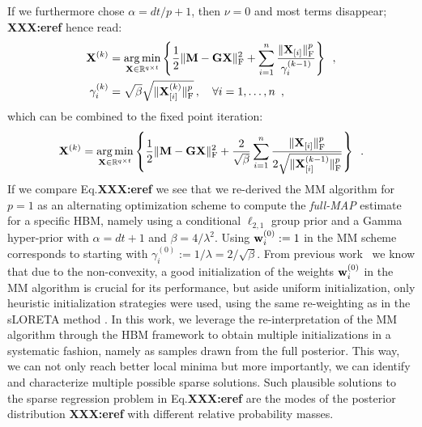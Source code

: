 If we furthermore chose $\alpha = d t/p + 1$, then $\nu = 0$ and most terms disappear; \textbf{XXX:eref}%
 hence read:
\begin{eqnarray}
\mathbf{X}^{(k)} &= \mathop{\mathrm{arg}\,\mathrm{min}}_{\mathbf{X}\in\mathbb{R}^{q \times t}} \left\lbrace \frac{1}{2} \|{\mathbf{M} -\mathbf{G} \mathbf{X}}\|_{\rm F}^2 + \sum_{i=1}^n  \frac{\|{\mathbf{X}_{[i]}}\|_{\rm F}^p}{\gamma^{(k-1)}_i} \right\rbrace \enspace, \label{eq:AO-nu0-X}\\
\gamma^{(k)}_i &= \sqrt{\beta} \sqrt{\|{\mathbf{X}^{(k)}_{[i]}}\|_{\rm F}^p} \, , \quad \forall i=1,\ldots,n \enspace, \label{eq:AO-nu0-gamma}
\end{eqnarray}
which can be combined to the fixed point iteration:
\begin{equation} \label{eq:AO-nu0-2}
\mathbf{X}^{(k)} = \mathop{\mathrm{arg}\,\mathrm{min}}_{\mathbf{X}\in\mathbb{R}^{q \times t}} \left\lbrace \frac{1}{2} \|{\mathbf{M} -\mathbf{G} \mathbf{X}}\|_{\rm F}^2 + \frac{2}{\sqrt{\beta}} \sum_{i=1}^n  \frac{\|{\mathbf{X}_{[i]}}\|_{\rm F}^p}{2 \sqrt{\|{\mathbf{X}^{(k-1)}_{[i]}}\|_{\rm F}^p}} \right\rbrace \enspace .
\end{equation}
If we compare Eq.\textbf{XXX:eref}%
 we see that we re-derived the MM algorithm for $p=1$ as an alternating optimization scheme to compute the \emph{full-MAP} estimate for a specific HBM, namely using a conditional $\ell_{2,1}$ group prior and a Gamma hyper-prior with $\alpha = dt + 1$ and $\beta = 4/\lambda^2$. Using $\mathbf{w}^{(0)}_{i} := 1$ in the MM scheme corresponds to starting with $\gamma_i^{(0)} := 1/\lambda =  2/\sqrt{\beta}$.
From previous work~\cite{strohmeier-etal:16} we know that due to the non-convexity, a good initialization of the weights $\mathbf{w}^{(0)}_{i}$ in the MM algorithm is crucial for its performance, but aside uniform initialization, only heuristic initialization strategies were used, \eg using the same re-weighting as in the sLORETA method \cite{Pa02}. In this work, we leverage the re-interpretation of the MM algorithm through the HBM framework to obtain multiple initializations in a systematic fashion, namely as samples drawn from the full posterior. This way, we can not only reach better local minima but more importantly, we can identify and characterize multiple possible sparse solutions. Such plausible solutions to the sparse regression problem in Eq.\textbf{XXX:eref}%
 are the modes of the posterior distribution \textbf{XXX:eref}%
  with different relative probability masses.


